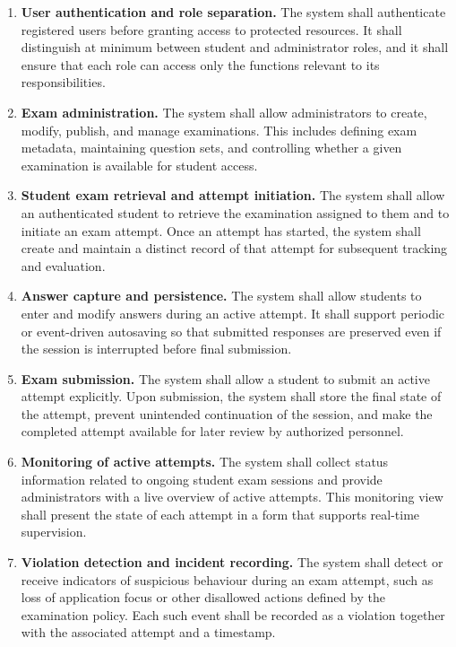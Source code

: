 \begin{enumerate}
    \item \textbf{User authentication and role separation.} The system shall authenticate registered users before granting access to protected resources. It shall distinguish at minimum between student and administrator roles, and it shall ensure that each role can access only the functions relevant to its responsibilities.

    \item \textbf{Exam administration.} The system shall allow administrators to create, modify, publish, and manage examinations. This includes defining exam metadata, maintaining question sets, and controlling whether a given examination is available for student access.

    \item \textbf{Student exam retrieval and attempt initiation.} The system shall allow an authenticated student to retrieve the examination assigned to them and to initiate an exam attempt. Once an attempt has started, the system shall create and maintain a distinct record of that attempt for subsequent tracking and evaluation.

    \item \textbf{Answer capture and persistence.} The system shall allow students to enter and modify answers during an active attempt. It shall support periodic or event-driven autosaving so that submitted responses are preserved even if the session is interrupted before final submission.

    \item \textbf{Exam submission.} The system shall allow a student to submit an active attempt explicitly. Upon submission, the system shall store the final state of the attempt, prevent unintended continuation of the session, and make the completed attempt available for later review by authorized personnel.

    \item \textbf{Monitoring of active attempts.} The system shall collect status information related to ongoing student exam sessions and provide administrators with a live overview of active attempts. This monitoring view shall present the state of each attempt in a form that supports real-time supervision.

    \item \textbf{Violation detection and incident recording.} The system shall detect or receive indicators of suspicious behaviour during an exam attempt, such as loss of application focus or other disallowed actions defined by the examination policy. Each such event shall be recorded as a violation together with the associated attempt and a timestamp.


\end{enumerate}
